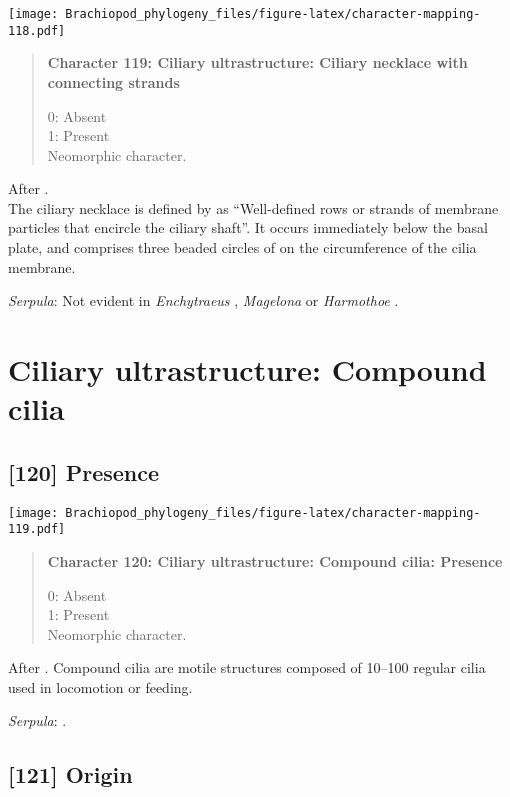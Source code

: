 \documentclass[openany]{book}
\theoremstyle{definition}
\theoremstyle{definition}
\theoremstyle{definition}
\theoremstyle{remark}
\begin{document}
\texttt{[image: Brachiopod\_phylogeny\_files/figure-latex/character-mapping-118.pdf]}

\begin{quote}
\textbf{Character 119: Ciliary ultrastructure: Ciliary necklace with
connecting strands}

0: Absent\\
1: Present\\
Neomorphic character.
\end{quote}

After \citet{Lundin2009}.\\
The ciliary necklace is defined by \citet{Gilula1972} as ``Well-defined
rows or strands of membrane particles that encircle the ciliary shaft''.
It occurs immediately below the basal plate, and comprises three beaded
circles of on the circumference of the cilia membrane.

\hypertarget{Serpula-coding-119}{}
\emph{Serpula}: Not evident in \emph{Enchytraeus} \citep{Reger1967},
\emph{Magelona} \citep{Bartolomaeus1995} or \emph{Harmothoe}
\citep{Holborow1969}.

\section{Ciliary ultrastructure: Compound
cilia}\label{ciliary-ultrastructure-compound-cilia}

\subsection*{{[}120{]} Presence}\label{presence}

\texttt{[image: Brachiopod\_phylogeny\_files/figure-latex/character-mapping-119.pdf]}

\begin{quote}
\textbf{Character 120: Ciliary ultrastructure: Compound cilia: Presence}

0: Absent\\
1: Present\\
Neomorphic character.
\end{quote}

After \citet{Lundin2009}. Compound cilia are motile structures composed
of 10--100 regular cilia used in locomotion or feeding.

\hypertarget{Serpula-coding-120}{}
\emph{Serpula}: \citet{Nielsen1987}.

\subsection*{{[}121{]} Origin}\label{origin}
\end{document}

